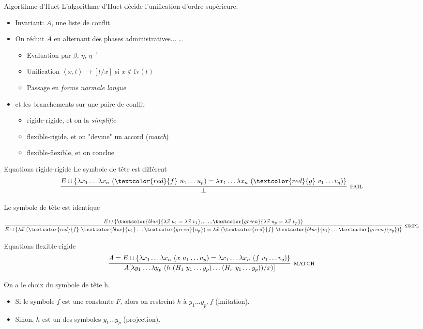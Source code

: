 \documentclass{beamer}
\begin{document}
\begin{frame}{Algortihme d'Huet}
    L'algorithme d'Huet décide l'unification d'ordre supérieure. 
    \begin{itemize}
        \item Invariant: $A$, une liste de conflit
        \item On réduit $A$ en alternant des phases administratives... \dots
        \begin{itemize}
            \item Evaluation par $\beta$, $\eta$, $\eta^{-1}$
            \item Unification $\left< x, t \right> \rightarrow [t/x]$ 
                si $x \notin \text{fv}(t)$
            \item[\Rightarrow] Passage en \emph{forme normale longue}
        \end{itemize}
        \item et les branchements sur une paire de conflit
        \begin{itemize}
            \item rigide-rigide, et on la \emph{simplifie}
            \item flexible-rigide, et on "devine" un accord (\emph{match})
            \item flexible-flexible, et on conclue
        \end{itemize}
    \end{itemize}
\end{frame}

\begin{frame}{Equations rigide-rigide}
Le symbole de tête est différent
\[ \infer[\textsc{fail}]
{\bot}
{E \cup \{ \lambda x_1 \ldots \lambda x_n \ (\textcolor{red}{f} \ u_1 \ldots u_p) = \lambda x_1 \ldots \lambda x_n \ (\textcolor{red}{g} \ v_1 \ldots v_q) \}}
\]

Le symbole de tête est identique

\[ \infer[\textsc{simpl}]
{E \cup \left\{ \lambda \vec{x} \ (\textcolor{red}{f}\ \textcolor{blue}{u_1} \ldots \textcolor{green}{u_p}) = \lambda \vec{x}\ (\textcolor{red}{f} \ \textcolor{blue}{v_1} \ldots \textcolor{green}{v_p}) \right\} }
{E \cup \{\textcolor{blue}{\lambda \vec{x}\  u_1  = \lambda \vec{x}\ v_1}, \ldots, \textcolor{green}{\lambda \vec{x}\  u_p = \lambda \vec{x}\ v_p}\}}
\]

\end{frame}

\begin{frame}{Equations flexible-rigide}
\[ \infer[\textsc{match}]
{A[\lambda y_1 \ldots \lambda y_p\ (h\ (H_1\ y_1 \ldots y_p) \ldots (H_r\ y_1 \ldots y_p))/x)]}
{A = E \cup \{\lambda x_1 \ldots \lambda x_n\ (x \ u_1 \ldots u_p) = \lambda x_1 \ldots \lambda x_n\ (f\ v_1 \ldots v_q)\}}
\]

On a le choix du symbole de tête h.
\begin{itemize}
    \item Si le symbole $f$ est une constante $F$, alors on restreint $h$ à $y_1 \ldots y_p,f$ (imitation).
    \item Sinon, $h$ est un des symboles $y_1 \ldots y_p$ (projection).
\end{itemize}
\end{frame}
\end{document}
